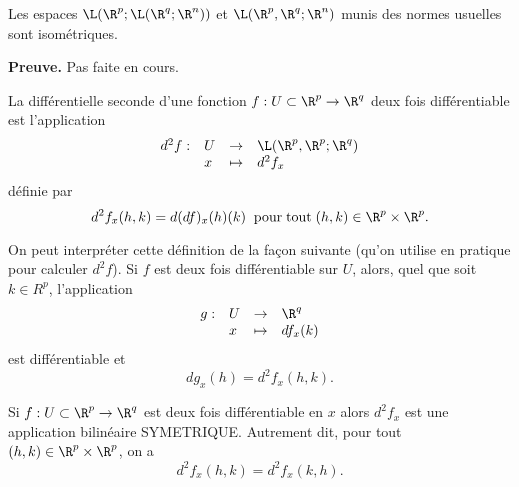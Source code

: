 \documentclass[12pt, class=report,crop=false]{standalone}
\begin{document}
 \begin{proposition}
\textcolor[rgb]{0.50,0.00,0.25}{
Les espaces $\L(\R^p;\L(\R^q;\R^n))$ et
$\L(\R^p,\R^q;\R^n)$ munis des normes usuelles
sont isom\'etriques.
}
\end{proposition}


{\textbf{Preuve.}} Pas faite en cours.


\begin{definition}
\textcolor[rgb]{0.73,0.00,0.00}{
  La diff\'erentielle seconde d'une fonction $f: U\subset \R^p\rightarrow \R^q$ deux fois diff\'erentiable
est l'application
\begin{equation*}
  \begin{array}{clll}
    d^2 f:& U & \rightarrow & \L(\R^p,\R^p;\R^q) \\
     & x & \mapsto & d^2f_x
  \end{array}
\end{equation*}
d\'efinie par
\begin{equation*}
  d^2f_x(h,k)=d(df)_x(h)(k) \;\mathrm{\; pour \; tout\;} (h,k)\in \R^p \times \R^p.
\end{equation*}}
\end{definition}

\begin{remarque*}\textcolor[rgb]{0.00,0.00,1.00}{
  On peut interpr\'eter cette d\'efinition de la fa\c{c}on suivante (qu'on utilise en pratique
pour calculer $d^2f$). Si $f$ est deux fois diff\'erentiable sur $U$, alors, quel que soit $k \in R^p$,
l'application
\begin{equation*}
  \begin{array}{clll}
    g:& U & \rightarrow & \R^q \\
     & x & \mapsto & df_x(k)
  \end{array}
\end{equation*}
est diff\'erentiable et
\begin{equation*}
  dg_x(h)=d^2f_x(h,k).
\end{equation*}}
\end{remarque*}

\begin{theoreme}
\textcolor[rgb]{0.50,0.00,0.25}{ Si $f: U \subset \R^p \rightarrow \R^q$ est deux fois diff\'erentiable en $x$ alors
$d^2f_x$ est une application bilin\'eaire SYMETRIQUE. Autrement dit, pour tout $(h,k)\in \R^p \times \R^p$, on a
\begin{equation*}
  d^2f_x(h,k)=d^2f_x(k,h).
\end{equation*}}
\end{theoreme}
\end{document}
